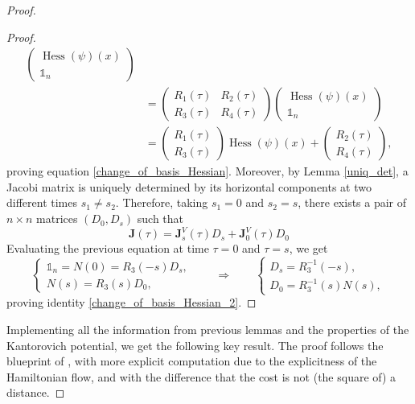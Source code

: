 \documentclass[reqno]{amsart}
\DeclareMathOperator{\Hess}{Hess}
\theoremstyle{plain}
\theoremstyle{definition}
\theoremstyle{remark}
\begin{document}
\begin{proof}
\begin{proof}
\begin{align}
\begin{pmatrix}
					\Hess(\psi)(x)\\
					\mathbb{1}_n
				\end{pmatrix}\\
				&=\begin{pmatrix}
				R_1(\tau) & R_2(\tau)\\
				R_3(\tau) & R_4(\tau)
				\end{pmatrix}\begin{pmatrix}
				\Hess(\psi)(x)\\
				\mathbb{1}_n
				\end{pmatrix}\\
				&=\begin{pmatrix}
					R_1(\tau)\\
					R_3(\tau)
				\end{pmatrix}\Hess(\psi)(x)+\begin{pmatrix}
				R_2(\tau)\\
				R_4(\tau)
				\end{pmatrix},
			\end{align}
			proving equation \eqref{change_of_basis_Hessian}.
			Moreover, by Lemma \ref{uniq_det}, a Jacobi matrix is uniquely determined by its horizontal components at two different times $s_1\neq s_2$. Therefore, taking $s_1=0$ and $s_2=s$, there exists a pair of $n\times n$ matrices $(D_0,D_s)$ such that
			\begin{equation}
				\mathbf{J}(\tau)=\mathbf{J}^V_s(\tau)D_s+\mathbf{J}^V_0(\tau)D_0
			\end{equation}
			Evaluating the previous equation at time $\tau=0$ and $\tau=s$, we get
			\begin{equation}
				\begin{cases}
					\mathbb{1}_n=N(0)=R_3(-s)D_s,\\
					N(s)=R_3(s)D_0,
				\end{cases}\qquad \Rightarrow\qquad
                				\begin{cases}
					D_s=R_3^{-1}(-s),\\
					D_0=R_3^{-1}(s)N(s),
				\end{cases}
			\end{equation}
			proving identity \eqref{change_of_basis_Hessian_2}.
		\end{proof}
		Implementing all the information from previous lemmas and the properties of the Kantorovich potential, we get the following key result. The proof follows the blueprint of \cite[Lemma 29]{SRintineq}, with more explicit computation due to the explicitness of the Hamiltonian flow, and with the difference that the cost is not (the square of) a distance. 

\end{proof}
\end{document}
